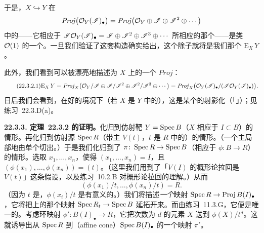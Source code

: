 于是，$X\hookrightarrow Y$ 在
\[
\mathit{Proj}\bigl(\mathcal{O}_Y(\mathscr{I})_\bullet\bigr)=\mathit{Proj}\bigl(\mathcal{O}_Y\oplus\mathscr{I}\oplus\mathscr{I}^2\oplus\cdots\bigr)
\]
中的\trSchemeTheoreticPreimage——它相应于 $\mathscr{I}\mathcal{O}_Y(\mathscr{I})_\bullet=\mathscr{I}\oplus\mathscr{I}^2\oplus\mathscr{I}^3\oplus\cdots$ 所相应的那个\trIdealSheaf——是类 $\mathcal{O}(1)$ 的一个\trEffectiveCartierDivisor。一旦我们验证了这套构造确实给出\trBlowup，这个除子就将是我们那个\trExceptionalDivisor{} $\mathrm{E}_X\,Y$。

此外，我们看到\trExceptionalDivisor{}可以被漂亮地描述为 $X$ 上的一个 $\mathit{Proj}$：
\[
\tag{22.3.2.1}\label{eq:exceptional-divisor-proj}
\mathrm{E}_X\,Y=\mathit{Proj}_X\bigl(\mathcal{O}_Y/\mathscr{I}\oplus\mathscr{I}/\mathscr{I}^2\oplus\mathscr{I}^2/\mathscr{I}^3\oplus\cdots\bigr)=\mathit{Proj}_X\bigl(\mathcal{O}_Y(\mathscr{I})_\bullet/(\mathscr{I}\mathcal{O}_Y(\mathscr{I})_\bullet)\bigr).
\]
日后我们会看到，在好的境况下（若 $X$ 是 $Y$ 中的\trRegularEmbedding），这是某个\trVectorBundle{}的射影化（「\trProjectivization\trNormalBundle」）；见\mbox{练习~22.3.D}(a)。

\textbf{22.3.3. \mbox{定理~22.3.2} 的证明。}\quad 化归到仿射靶 $Y=\operatorname{Spec} B$（$X$ 相应于\trIdeal{} $I\subset B$）的情形。再化归到仿射源 $\operatorname{Spec} R$（带主\trEffectiveCartierDivisor{} $V(t)$，$t$ 是 $R$ 中的\trNonZerodivisor）的情形。（一个主\trEffectiveCartierDivisor{}局部地由单个\trNonZerodivisor{}切出。）于是我们化归到了 $\pi\colon\operatorname{Spec} R\to\operatorname{Spec} B$（相应于 $\phi\colon B\to R$）的情形。选取 $x_1,\dots,x_n$，使得 $(x_1,\dots,x_n)=I$，且 $(\phi(x_1),\dots,\phi(x_n))=(t)$。（这里我们用到了「$V(I)$ 的概形论拉回是 $V(t)$」这条假设，以及\mbox{练习~10.2.B} 对概形论拉回的理解。）从而
\[
\tag{22.3.3.1}\label{eq:phin-generated-unit}
(\phi(x_1)/t,\dots,\phi(x_n)/t)=R.
\]
（因为 $t$ 是\trNonZerodivisor，$\phi(x_i)/t$ 是有意义的。）我们将描述\emph{一个}映射 $\operatorname{Spec} R\to\operatorname{Proj} B(I)_\bullet$，它将把\trOpenSet{}上的那个映射 $\operatorname{Spec} R_t\to\operatorname{Spec} B$ 延拓开来。而由\mbox{练习~11.3.G}，它便是唯一的。考虑环映射 $\phi'\colon B(I)_\bullet\to R$，它把次数为 $d$ 的元素 $X$ 送到 $\phi(X)/t^d$。这就诱导出从 $\operatorname{Spec} R$ 到\textbf{\trAffine\trCone}（affine cone）$\operatorname{Spec} B(I)_\bullet$ 的一个映射 $\pi'$。

